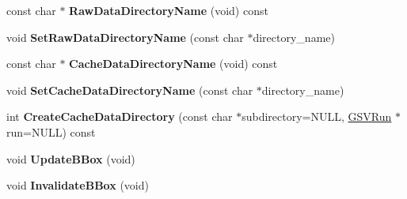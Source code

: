\begin{DoxyCompactItemize}
\item 
const char $\ast$ {\bfseries Raw\+Data\+Directory\+Name} (void) const \hypertarget{class_g_s_v_scene_ad214c78f2d3757efe5f594fe258470e2}{}\label{class_g_s_v_scene_ad214c78f2d3757efe5f594fe258470e2}

\item 
void {\bfseries Set\+Raw\+Data\+Directory\+Name} (const char $\ast$directory\+\_\+name)\hypertarget{class_g_s_v_scene_ae01aca0c5f894d86dfd32f8e29624cd4}{}\label{class_g_s_v_scene_ae01aca0c5f894d86dfd32f8e29624cd4}

\item 
const char $\ast$ {\bfseries Cache\+Data\+Directory\+Name} (void) const \hypertarget{class_g_s_v_scene_ac152ec61bd2d72956978bc7899c01a3c}{}\label{class_g_s_v_scene_ac152ec61bd2d72956978bc7899c01a3c}

\item 
void {\bfseries Set\+Cache\+Data\+Directory\+Name} (const char $\ast$directory\+\_\+name)\hypertarget{class_g_s_v_scene_a13976ac3e21b3a6fb8591da0013f3249}{}\label{class_g_s_v_scene_a13976ac3e21b3a6fb8591da0013f3249}

\item 
int {\bfseries Create\+Cache\+Data\+Directory} (const char $\ast$subdirectory=N\+U\+LL, \hyperlink{class_g_s_v_run}{G\+S\+V\+Run} $\ast$run=N\+U\+LL) const \hypertarget{class_g_s_v_scene_abeeb4131664ea38878bf251ab3a67087}{}\label{class_g_s_v_scene_abeeb4131664ea38878bf251ab3a67087}

\item 
void {\bfseries Update\+B\+Box} (void)\hypertarget{class_g_s_v_scene_a93dc3eff9fc1aec0a4a0d12a32091e8f}{}\label{class_g_s_v_scene_a93dc3eff9fc1aec0a4a0d12a32091e8f}

\item 
void {\bfseries Invalidate\+B\+Box} (void)\hypertarget{class_g_s_v_scene_a4715cc1259bf616ae058719c8519ed9e}{}\label{class_g_s_v_scene_a4715cc1259bf616ae058719c8519ed9e}

\end{DoxyCompactItemize}
